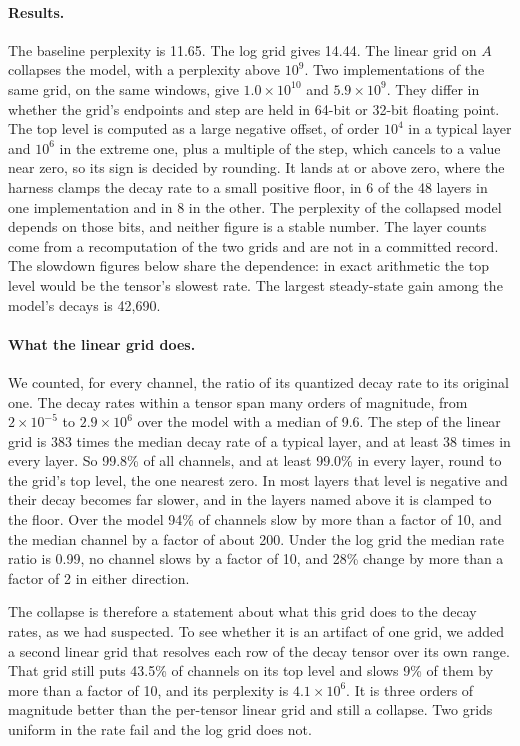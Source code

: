 \documentclass[10pt]{article}
\begin{document}
\paragraph{Results.} The baseline perplexity is 11.65. The log grid gives 14.44. The linear grid
on $A$ collapses the model, with a perplexity above $10^{9}$. Two implementations of the same
grid, on the same windows, give $1.0\times10^{10}$ and $5.9\times10^{9}$. They differ in whether
the grid's endpoints and step are held in 64-bit or 32-bit floating point. The top level is
computed as a large negative offset, of order $10^{4}$ in a typical layer and $10^{6}$ in the
extreme one, plus a multiple of the step, which cancels to a value
near zero, so its sign is decided by rounding. It lands at or above zero, where the harness clamps
the decay rate to a small positive floor, in 6 of the 48 layers in one implementation and in 8
in the other. The perplexity of the collapsed model depends on those bits, and neither figure is
a stable number. The layer counts come from a recomputation of the two grids and are not in a
committed record. The slowdown figures below share the dependence: in exact arithmetic the top
level would be the tensor's slowest rate. The
largest steady-state gain among the model's decays is 42{,}690.

\paragraph{What the linear grid does.} We counted, for every channel, the ratio of its quantized
decay rate to its original one. The decay rates within a tensor span many orders of magnitude,
from $2\times10^{-5}$ to $2.9\times10^{6}$ over the model with a median of 9.6. The step of the
linear grid is 383 times the median decay rate of a typical layer, and at least 38 times in every
layer. So 99.8\% of all channels, and at least 99.0\% in every layer, round to the grid's top
level, the one nearest zero. In most layers that level is negative and their decay
becomes far slower, and in the layers named above it is clamped to the floor. Over the model 94\% of channels slow by more than a factor of 10, and the median channel by
a factor of about 200. Under the log grid the median rate ratio is 0.99, no channel slows by a
factor of 10, and 28\% change by more than a factor of 2 in either direction.

The collapse is therefore a statement about what this grid does to the decay rates, as we had
suspected. To see whether it is an artifact of one grid, we added a second linear grid that
resolves each row of the decay tensor over its own range. That grid still puts 43.5\% of channels
on its top level and slows 9\% of them by more than a factor of 10, and its perplexity is
$4.1\times10^{6}$. It is three orders of magnitude better than the per-tensor linear grid and
still a collapse. Two grids uniform in the rate fail and the log grid does not.
\end{document}
